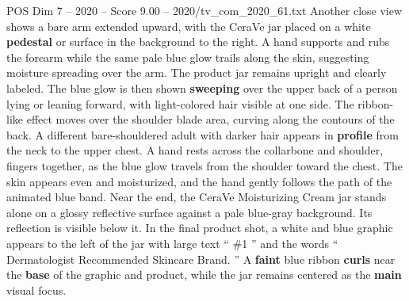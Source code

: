 \begin{textsample}{POS Dim 7 – 2020 – Score 9.00 – 2020/tv\_com\_2020\_61.txt}
Another close view shows a bare arm extended upward, with the CeraVe jar placed on a white \textbf{pedestal} or surface in the background to the right.
A hand supports and rubs the forearm while the same pale blue glow trails along the skin, suggesting moisture spreading over the arm.
The product jar remains upright and clearly labeled.
The blue glow is then shown \textbf{sweeping} over the upper back of a person lying or leaning forward, with light-colored hair visible at one side.
The ribbon-like effect moves over the shoulder blade area, curving along the contours of the back.
A different bare-shouldered adult with darker hair appears in \textbf{profile} from the neck to the upper chest.
A hand rests across the collarbone and shoulder, fingers together, as the blue glow travels from the shoulder toward the chest.
The skin appears even and moisturized, and the hand gently follows the path of the animated blue band.
Near the end, the CeraVe Moisturizing Cream jar stands alone on a glossy reflective surface against a pale blue-gray background.
Its reflection is visible below it.
In the final product shot, a white and blue graphic appears to the left of the jar with large text “ \#1 ” and the words “ Dermatologist Recommended Skincare Brand. ” A \textbf{faint} blue ribbon \textbf{curls} near the \textbf{base} of the graphic and product, while the jar remains centered as the \textbf{main} visual focus.

\end{textsample}
